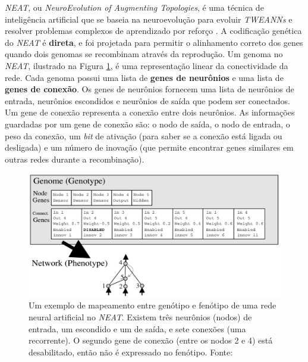 \textit{NEAT}, ou \textit{NeuroEvolution of Augmenting Topologies}, é uma
técnica de inteligência artificial que se baseia na neuroevolução para evoluir
\textit{TWEANNs} e resolver problemas complexos de aprendizado por reforço
\cite{stanley:ec02}. A codificação genética do \textit{NEAT} é \textbf{direta},
e foi projetada para permitir o alinhamento correto dos genes quando dois
genomas se recombinam através da reprodução. Um genoma no \textit{NEAT},
ilustrado na Figura \ref{fig:neat-encoding-example}, é uma representação linear
da conectividade da rede. Cada genoma possui uma lista de \textbf{genes de
neurônios} e uma lista de \textbf{genes de conexão}. Os genes de neurônios
fornecem uma lista de neurônios de entrada, neurônios escondidos e neurônios de
saída que podem ser conectados.  Um gene de conexão representa a conexão entre
dois neurônios. As informações guardadas por um gene de conexão são: o nodo de
saída, o nodo de entrada, o peso da conexão, um \textit{bit} de ativação (para
saber se a conexão está ligada ou desligada) e um número de inovação (que
permite encontrar genes similares em outras redes durante a recombinação). 

\begin{figure}[H]
\centering
\includegraphics[width=\textwidth]{fig/neat-encoding-example.pdf}
\caption{Um exemplo de mapeamento entre genótipo e fenótipo de uma rede neural
artificial no \textit{NEAT}. Existem três neurônios (nodos) de entrada, um
escondido e um de saída, e sete conexões (uma recorrente). O segundo gene de
conexão (entre os nodos 2 e 4) está desabilitado, então não é expressado no
fenótipo. Fonte: \cite{stanley:ec02}}
\label{fig:neat-encoding-example}
\end{figure}


